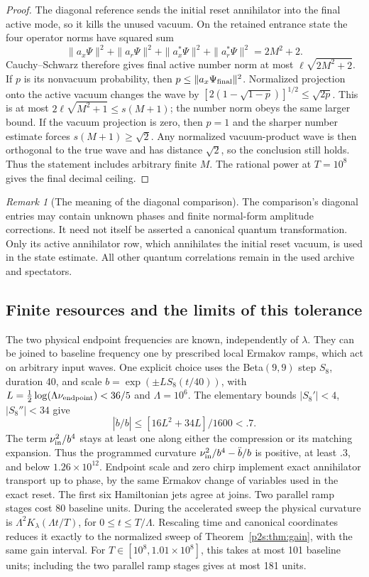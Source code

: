 \documentclass[11pt]{article}
\numberwithin{equation}{section}
\theoremstyle{definition}
\theoremstyle{remark}
\newtheorem{remark}[theorem]{Remark}
\begin{document}
\begin{proof}
The diagonal reference sends the initial reset annihilator into the final
active mode, so it kills the unused vacuum. On the retained entrance state
the four operator norms have squared sum
\[
 \|a_x\Psi\|^2+\|a_r\Psi\|^2+
 \|a_x^*\Psi\|^2+\|a_r^*\Psi\|^2=2M^2+2.
\]
Cauchy--Schwarz therefore gives final active number norm at most
$\ell\sqrt{2M^2+2}$. If $p$ is its nonvacuum probability, then
$p\leq\|a_x\Psi_{\rm final}\|^2$. Normalized projection onto the active
vacuum changes the wave by $[2(1-\sqrt{1-p})]^{1/2}\leq\sqrt{2p}$.
This is at most $2\ell\sqrt{M^2+1}\leq s(M+1)$; the number norm obeys
the same larger bound. If the vacuum projection is zero, then $p=1$
and the sharper number estimate forces $s(M+1)\geq\sqrt2$. Any normalized
vacuum-product wave is then orthogonal to the true wave and has distance
$\sqrt2$, so the conclusion still holds. Thus the statement includes
arbitrary finite $M$.
The rational power at $T=10^8$ gives the final decimal ceiling.
\end{proof}

\begin{remark}[The meaning of the diagonal comparison]
The comparison's diagonal entries may contain unknown phases and finite
normal-form amplitude corrections. It need not itself be asserted a
canonical quantum transformation. Only its active annihilator row, which
annihilates the initial reset vacuum, is used in the state estimate. All
other quantum correlations remain in the used archive and spectators.
\end{remark}

\subsection{Finite resources and the limits of this tolerance}
The two physical endpoint frequencies are known, independently of
$\lambda$. They can be joined to baseline frequency one by prescribed
local Ermakov ramps, which act on arbitrary input waves. One explicit
choice uses the Beta$(9,9)$ step $S_8$, duration 40, and scale
$b=\exp(\pm L S_8(t/40))$, with
$L=\tfrac12\log(\Lambda\nu_{\rm endpoint})<36/5$ and $\Lambda=10^6$.
The elementary bounds $|S_8'|<4$, $|S_8''|<34$ give
\[
 |\ddot b/b|\leq[16L^2+34L]/1600<.7.
\]
The term $\nu_{\rm in}^2/b^4$ stays at least one along either the
compression or its matching expansion. Thus the programmed curvature
$\nu_{\rm in}^2/b^4-\ddot b/b$ is positive, at least $.3$, and below
$1.26\times10^{12}$. Endpoint scale and zero chirp
implement exact annihilator transport up to phase, by the same Ermakov
change of variables used in the exact reset. The first six Hamiltonian
jets agree at joins. Two parallel ramp stages cost 80 baseline units.
During the accelerated sweep the physical curvature is
$\Lambda^2K_\lambda(\Lambda t/T)$, for $0\leq t\leq T/\Lambda$.
Rescaling time and canonical coordinates reduces it exactly to the
normalized sweep of Theorem~\ref{p2s:thm:gain}, with the same gain interval.
For $T\in[10^8,1.01\times10^8]$, this takes at most 101 baseline units;
including the two parallel ramp stages gives at most 181 units.
\end{document}
